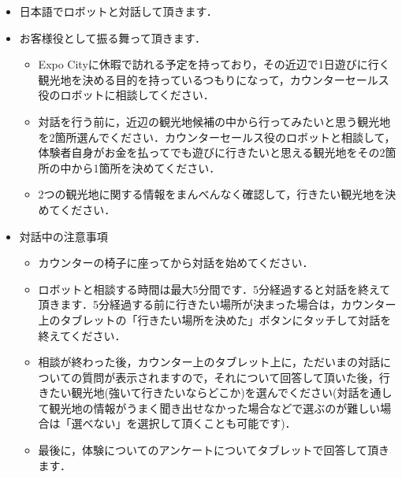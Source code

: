 \begin{itemize}
    \item 日本語でロボットと対話して頂きます．
    \item お客様役として振る舞って頂きます．
    \begin{itemize}
        \item Expo Cityに休暇で訪れる予定を持っており，その近辺で1日遊びに行く観光地を決める目的を持っているつもりになって，カウンターセールス役のロボットに相談してください．
        \item 対話を行う前に，近辺の観光地候補の中から行ってみたいと思う観光地を2箇所選んでください．カウンターセールス役のロボットと相談して，体験者自身がお金を払ってでも遊びに行きたいと思える観光地をその2箇所の中から1箇所を決めてください．
        \item 2つの観光地に関する情報をまんべんなく確認して，行きたい観光地を決めてください．
    \end{itemize}
    \item 対話中の注意事項
    \begin{itemize}
    \item カウンターの椅子に座ってから対話を始めてください．
    \item ロボットと相談する時間は最大5分間です．5分経過すると対話を終えて頂きます．5分経過する前に行きたい場所が決まった場合は，カウンター上のタブレットの「行きたい場所を決めた」ボタンにタッチして対話を終えてください．
    \item 相談が終わった後，カウンター上のタブレット上に，ただいまの対話についての質問が表示されますので，それについて回答して頂いた後，行きたい観光地(強いて行きたいならどこか)を選んでください(対話を通して観光地の情報がうまく聞き出せなかった場合などで選ぶのが難しい場合は「選べない」を選択して頂くことも可能です)．
    \item 最後に，体験についてのアンケートについてタブレットで回答して頂きます．
    \end{itemize}
\end{itemize}

